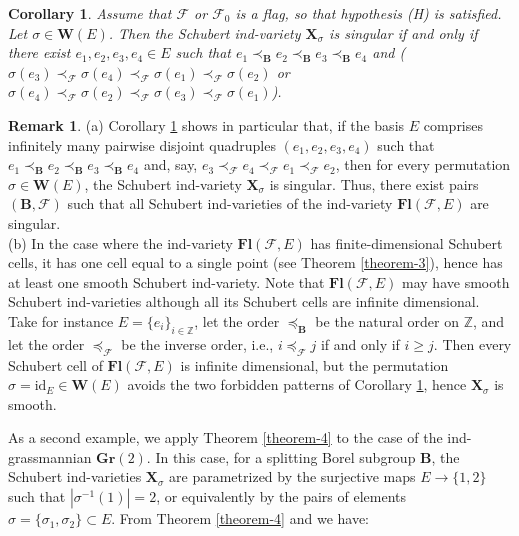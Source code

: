 \documentclass[12pt]{amsart}
\newtheorem{corollary}{Corollary}
\theoremstyle{definition}
\newtheorem{remark}{Remark}
\begin{document}
\begin{corollary}
\label{corollary-2}
Assume that $\mathcal{F}$ or $\mathcal{F}_0$ is a flag, so that hypothesis {\rm (H)} is satisfied.
Let $\sigma\in\mathbf{W}(E)$. Then the Schubert ind-variety $\mathbf{X}_\sigma$ is singular if and only if there exist $e_1,e_2,e_3,e_4\in E$ such that $e_1\prec_\mathbf{B}e_2\prec_\mathbf{B}e_3\prec_\mathbf{B}e_4$ and ($\sigma(e_3)\prec_\mathcal{F}\sigma(e_4)\prec_\mathcal{F}\sigma(e_1)\prec_\mathcal{F}\sigma(e_2)$ or $\sigma(e_4)\prec_\mathcal{F}\sigma(e_2)\prec_\mathcal{F}\sigma(e_3)\prec_\mathcal{F}\sigma(e_1)$).
\end{corollary}

\begin{remark}
{\rm (a)}
Corollary \ref{corollary-2} shows in particular that, if the basis $E$ comprises infinitely many pairwise disjoint quadruples $(e_1,e_2,e_3,e_4)$ such that $e_1\prec_\mathbf{B}e_2\prec_\mathbf{B}e_3\prec_\mathbf{B}e_4$ and, say, $e_3\prec_\mathcal{F}e_4\prec_\mathcal{F}e_1\prec_\mathcal{F}e_2$, then for every permutation $\sigma\in\mathbf{W}(E)$, the Schubert ind-variety $\mathbf{X}_\sigma$ is singular. Thus, there exist pairs $(\mathbf{B},\mathcal{F})$ such that all Schubert ind-varieties of the ind-variety $\mathbf{Fl}(\mathcal{F},E)$ are singular. \\
{\rm (b)}
In the case where the ind-variety $\mathbf{Fl}(\mathcal{F},E)$ has finite-dimensional Schubert cells, it has one cell equal to a single point (see Theorem \ref{theorem-3}), hence has at least one smooth Schubert ind-variety.
Note that $\mathbf{Fl}(\mathcal{F},E)$ may have smooth Schubert ind-varieties although all its Schubert cells are infinite dimensional. Take for instance $E=\{e_i\}_{i\in\mathbb{Z}}$, let the order $\preceq_\mathbf{B}$ be the natural order on $\mathbb{Z}$, and let the order $\preceq_\mathcal{F}$ be the inverse order, i.e., $i\preceq_\mathcal{F}j$ if and only if $i\geq j$. Then every Schubert cell of $\mathbf{Fl}(\mathcal{F},E)$ is infinite dimensional, but the permutation $\sigma=\mathrm{id}_E\in\mathbf{W}(E)$ avoids the two forbidden patterns of Corollary \ref{corollary-2}, hence $\mathbf{X}_\sigma$ is smooth.
\end{remark}

As a second example,
we apply Theorem \ref{theorem-4} to the case of the ind-grassmannian $\mathbf{Gr}(2)$. In this case, for a splitting Borel subgroup $\mathbf{B}$, the Schubert ind-varieties $\mathbf{X}_\sigma$ are parametrized by the surjective maps $E\to \{1,2\}$ such that $|\sigma^{-1}(1)|=2$, or equivalently by the pairs of elements $\sigma=\{\sigma_1,\sigma_2\}\subset E$.
From Theorem \ref{theorem-4} and \cite[\S9.3.3]{Billey-Lakshmibai} we have:
\end{document}
